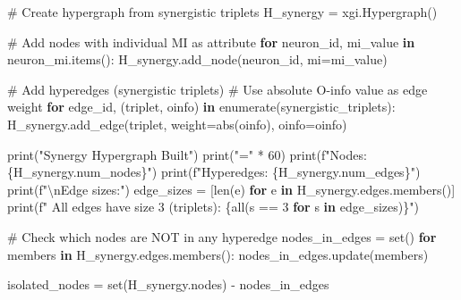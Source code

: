 \documentclass[
  11pt,
  letterpaper,
  oneside,
  openany]{book}
\newenvironment{Shaded}{\begin{snugshade}}{\end{snugshade}}
\newcommand{\BuiltInTok}[1]{\textcolor[rgb]{0.00,0.23,0.31}{#1}}
\newcommand{\CharTok}[1]{\textcolor[rgb]{0.13,0.47,0.30}{#1}}
\newcommand{\CommentTok}[1]{\textcolor[rgb]{0.37,0.37,0.37}{#1}}
\newcommand{\ControlFlowTok}[1]{\textcolor[rgb]{0.00,0.23,0.31}{\textbf{#1}}}
\newcommand{\DecValTok}[1]{\textcolor[rgb]{0.68,0.00,0.00}{#1}}
\newcommand{\KeywordTok}[1]{\textcolor[rgb]{0.00,0.23,0.31}{\textbf{#1}}}
\newcommand{\NormalTok}[1]{\textcolor[rgb]{0.00,0.23,0.31}{#1}}
\newcommand{\OperatorTok}[1]{\textcolor[rgb]{0.37,0.37,0.37}{#1}}
\newcommand{\SpecialCharTok}[1]{\textcolor[rgb]{0.37,0.37,0.37}{#1}}
\newcommand{\SpecialStringTok}[1]{\textcolor[rgb]{0.13,0.47,0.30}{#1}}
\newcommand{\StringTok}[1]{\textcolor[rgb]{0.13,0.47,0.30}{#1}}
\begin{document}
\begin{Shaded}
\begin{Highlighting}[]
\CommentTok{\# Create hypergraph from synergistic triplets}
\NormalTok{H\_synergy }\OperatorTok{=}\NormalTok{ xgi.Hypergraph()}

\CommentTok{\# Add nodes with individual MI as attribute}
\ControlFlowTok{for}\NormalTok{ neuron\_id, mi\_value }\KeywordTok{in}\NormalTok{ neuron\_mi.items():}
\NormalTok{    H\_synergy.add\_node(neuron\_id, mi}\OperatorTok{=}\NormalTok{mi\_value)}

\CommentTok{\# Add hyperedges (synergistic triplets)}
\CommentTok{\# Use absolute O{-}info value as edge weight}
\ControlFlowTok{for}\NormalTok{ edge\_id, (triplet, oinfo) }\KeywordTok{in} \BuiltInTok{enumerate}\NormalTok{(synergistic\_triplets):}
\NormalTok{    H\_synergy.add\_edge(triplet, weight}\OperatorTok{=}\BuiltInTok{abs}\NormalTok{(oinfo), oinfo}\OperatorTok{=}\NormalTok{oinfo)}

\BuiltInTok{print}\NormalTok{(}\StringTok{"Synergy Hypergraph Built"}\NormalTok{)}
\BuiltInTok{print}\NormalTok{(}\StringTok{"="} \OperatorTok{*} \DecValTok{60}\NormalTok{)}
\BuiltInTok{print}\NormalTok{(}\SpecialStringTok{f"Nodes: }\SpecialCharTok{\{}\NormalTok{H\_synergy}\SpecialCharTok{.}\NormalTok{num\_nodes}\SpecialCharTok{\}}\SpecialStringTok{"}\NormalTok{)}
\BuiltInTok{print}\NormalTok{(}\SpecialStringTok{f"Hyperedges: }\SpecialCharTok{\{}\NormalTok{H\_synergy}\SpecialCharTok{.}\NormalTok{num\_edges}\SpecialCharTok{\}}\SpecialStringTok{"}\NormalTok{)}
\BuiltInTok{print}\NormalTok{(}\SpecialStringTok{f"}\CharTok{\textbackslash{}n}\SpecialStringTok{Edge sizes:"}\NormalTok{)}
\NormalTok{edge\_sizes }\OperatorTok{=}\NormalTok{ [}\BuiltInTok{len}\NormalTok{(e) }\ControlFlowTok{for}\NormalTok{ e }\KeywordTok{in}\NormalTok{ H\_synergy.edges.members()]}
\BuiltInTok{print}\NormalTok{(}\SpecialStringTok{f"  All edges have size 3 (triplets): }\SpecialCharTok{\{}\BuiltInTok{all}\NormalTok{(s }\OperatorTok{==} \DecValTok{3} \ControlFlowTok{for}\NormalTok{ s }\KeywordTok{in}\NormalTok{ edge\_sizes)}\SpecialCharTok{\}}\SpecialStringTok{"}\NormalTok{)}

\CommentTok{\# Check which nodes are NOT in any hyperedge}
\NormalTok{nodes\_in\_edges }\OperatorTok{=} \BuiltInTok{set}\NormalTok{()}
\ControlFlowTok{for}\NormalTok{ members }\KeywordTok{in}\NormalTok{ H\_synergy.edges.members():}
\NormalTok{    nodes\_in\_edges.update(members)}

\NormalTok{isolated\_nodes }\OperatorTok{=} \BuiltInTok{set}\NormalTok{(H\_synergy.nodes) }\OperatorTok{{-}}\NormalTok{ nodes\_in\_edges}


\end{Highlighting}
\end{Shaded}
\end{document}
